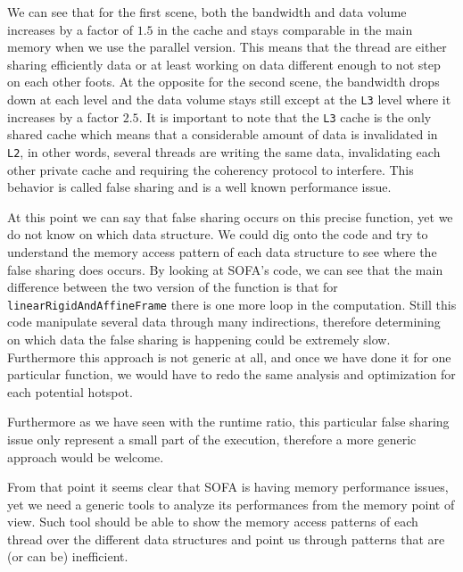 We can see that for the first scene, both the bandwidth and data volume increases by a factor of $1.5$ in the cache and stays comparable in the main memory when we use the parallel version.
This means that the thread are either sharing efficiently data or at least working on data different enough to not step on each other foots.
At the opposite for the second scene, the bandwidth drops down at each level and the data volume stays still except at the \texttt{L3} level where it increases by a factor $2.5$.
It is important to note that the \texttt{L3} cache is the only shared cache which means that a considerable amount of data is invalidated in \texttt{L2}, in other words, several threads are writing the same data, invalidating each other private cache and requiring the coherency protocol to interfere.
This behavior is called false sharing and is a well known performance issue.

At this point we can say that false sharing occurs on this precise function, yet we do not know on which data structure.
We could dig onto the code and try to understand the memory access pattern of each data structure to see where the false sharing does occurs.
By looking at \gls{SOFA}'s code, we can see that the main difference between the two version of the function is that for \texttt{linearRigidAndAffineFrame} there is one more loop in the computation.
Still this code manipulate several data through many indirections, therefore determining on which data the false sharing is happening could be extremely slow.
Furthermore this approach is not generic at all, and once we have done it for one particular function, we would have to redo the same analysis and optimization for each potential hotspot.

Furthermore as we have seen with the runtime ratio, this particular false sharing issue only represent a small part of the execution, therefore a more generic approach would be welcome.

From that point it seems clear that \gls{SOFA} is having memory performance issues, yet we need a generic tools to analyze its performances from the memory point of view.
Such tool should be able to show the memory access patterns of each thread over the different data structures and point us through patterns that are (or can be) inefficient.

